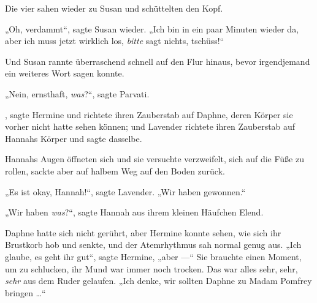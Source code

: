 Die vier sahen wieder zu Susan und schüttelten den Kopf.

„Oh, verdammt“, sagte Susan wieder.
„Ich bin in ein paar Minuten wieder da, aber ich muss jetzt wirklich los, \emph{bitte} sagt nichts, tschüss!“

Und Susan rannte überraschend schnell auf den Flur hinaus, bevor irgendjemand ein weiteres Wort sagen konnte.

„Nein, ernsthaft, \emph{was}?“, sagte Parvati.

, sagte Hermine und richtete ihren Zauberstab auf Daphne, deren Körper sie vorher nicht hatte sehen können; und Lavender richtete ihren Zauberstab auf Hannahs Körper und sagte dasselbe.

Hannahs Augen öffneten sich und sie versuchte verzweifelt, sich auf die Füße zu rollen, sackte aber auf halbem Weg auf den Boden zurück.

„Es ist okay, Hannah!“, sagte Lavender.
„Wir haben gewonnen.“

„Wir haben \emph{was}?“, sagte Hannah aus ihrem kleinen Häufchen Elend.

Daphne hatte sich nicht gerührt, aber Hermine konnte sehen, wie sich ihr Brustkorb hob und senkte, und der Atemrhythmus sah normal genug aus.
„Ich glaube, es geht ihr gut“, sagte Hermine, „aber —“ Sie brauchte einen Moment, um zu schlucken, ihr Mund war immer noch trocken. Das war alles sehr, sehr, \emph{sehr} aus dem Ruder gelaufen.
„Ich denke, wir sollten Daphne zu Madam Pomfrey bringen …“

